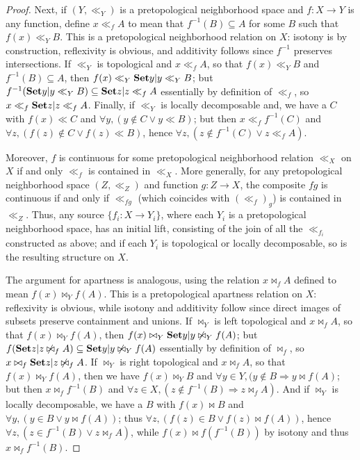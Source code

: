 \documentclass{article}
\def\cpl#1{\neg #1}
\let\implies\Rightarrow
\def\inv{^{-1}}
\def\nn{\ensuremath{\neg\neg}}
\def\Set{\mathbf{Set}}
\def\PATopnn{\mathbf{pATop}_{\nn}}
\begin{document}
\begin{proof}
  Next, if $(Y,\ll_Y)$ is a pretopological neighborhood space and $f:X\to Y$ is any function, define $x\ll_f A$ to mean that $f\inv(B)\subseteq A$ for some $B$ such that $f(x)\ll_Y B$.
  This is a pretopological neighborhood relation on $X$: isotony is by construction, reflexivity is obvious, and additivity follows since $f\inv$ preserves intersections.
  If $\ll_Y$ is topological and $x\ll_f A$, so that $f(x)\ll_Y B$ and $f\inv(B)\subseteq A$, then $f(x)\ll_Y \setof{y|y\ll_Y B}$; but $f\inv(\setof{y|y\ll_Y B}) \subseteq \setof{z|z\ll_f A}$ essentially by definition of $\ll_f$, so $x \ll_f \setof{z|z\ll_f A}$.
  Finally, if $\ll_Y$ is locally decomposable and, we have a $C$ with $f(x)\ll C$ and $\forall y, (y\notin C \lor y\ll B)$; but then $x\ll_f f\inv(C)$ and $\forall z, (f(z)\notin C \lor f(z) \ll B)$, hence $\forall z, (z\notin f\inv(C) \lor z \ll_f A)$.

  Moreover, $f$ is continuous for some pretopological neighborhood relation $\ll_X$ on $X$ if and only $\ll_f$ is contained in $\ll_X$.
  More generally, for any pretopological neighborhood space $(Z,\ll_Z)$ and function $g:Z\to X$, the composite $f g$ is continuous if and only if $\ll_{f g}$ (which coincides with $(\ll_f)_g$) is contained in $\ll_Z$.
  Thus, any source $\{ f_i : X \to Y_i \}$, where each $Y_i$ is a pretopological neighborhood space, has an initial lift, consisting of the join of all the $\ll_{f_i}$ constructed as above; and if each $Y_i$ is topological %
  or locally decomposable, so is the resulting structure on $X$.

  The argument for apartness is analogous, using the relation $x\bowtie_f A$ defined to mean $f(x)\bowtie_Y f(A)$.
  This is a pretopological apartness relation on $X$: reflexivity is obvious, while isotony and additivity follow since direct images of subsets preserve containment and unions.
  If $\bowtie_Y$ is left topological and $x\bowtie_f A$, so that $f(x)\bowtie_Y f(A)$, then $f(x) \bowtie_Y \setof{y|y\not\bowtie_Y f(A)}$; but $f(\setof{z|z\not\bowtie_f A}) \subseteq \setof{y|y\not\bowtie_Y f(A)}$ essentially by definition of $\bowtie_f$, so $x\bowtie_f \setof{z|z\not\bowtie_f A}$.
  If $\bowtie_Y$ is right topological and $x\bowtie_f A$, so that $f(x)\bowtie_Y f(A)$, then we have $f(x) \bowtie_Y B$ and $\forall y\in Y, (y\notin B \implies y\bowtie f(A)$; but then $x\bowtie_f f\inv(B)$ and $\forall z\in X, (z\notin f\inv(B)\implies z\bowtie_f A)$.
  And if $\bowtie_Y$ is locally decomposable, we have a $B$ with $f(x)\bowtie B$ and $\forall y,(y\in B \lor y\bowtie f(A))$; thus $\forall z, (f(z)\in B \lor f(z)\bowtie f(A))$, hence $\forall z, (z\in f\inv(B) \lor z\bowtie_f A)$, while $f(x) \bowtie f(f\inv(B))$ by isotony and thus $x \bowtie_f f\inv(B)$.


\end{proof}
\end{document}
